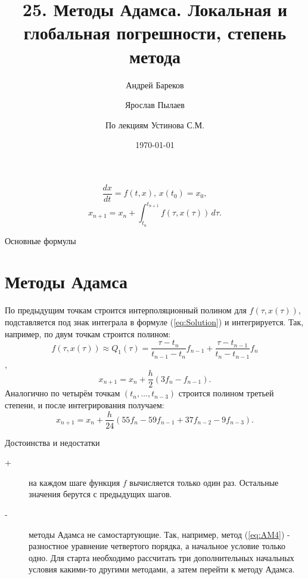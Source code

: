 \documentclass[a4paper,11pt]{article}
\title{25. Методы Адамса. Локальная и глобальная погрешности, степень метода}
\author{Андрей Бареков \and Ярослав Пылаев \and По лекциям Устинова С.М.}
\date{\today}
\begin{document}
\maketitle
\newpage

\begin{importantblock}
  \begin{equation}
    \frac{dx}{dt} = f(t, x),\, x(t_0) = x_0,
    \label{eq:LDLE}
  \end{equation}
  \begin{equation}
    x_{n+1} = x_n + \int_{t_n}^{t_{n+1}} f(\tau, x(\tau))\,d\tau.
    \label{eq:Solution}
  \end{equation}
  \begin{center}
    \small{Основные формулы}
  \end{center}
\end{importantblock}

\section{Методы Адамса}
По предыдущим точкам строится интерполяционный полином для $f(\tau, x(\tau))$, подставляется
  под знак интеграла в формуле (\ref{eq:Solution}) и интегрируется. Так, например, по двум точкам строится полином:
\[f(\tau,x(\tau)) \approx Q_1(\tau) = \frac{\tau - t_n}{t_{n-1} - t_n}f_{n-1} + \frac{\tau - t_{n-1}}{t_n - t_{n-1}}f_n\],
\begin{equation}
  x_{n+1} = x_n + \frac{h}{2}(3f_n - f_{n-1}).
  \label{eq:AM2}
\end{equation}
Аналогично по четырём точкам $(t_n, \dots, t_{n-3})$ строится полином третьей степени, и после интегрирования получаем:
\begin{equation}
  x_{n+1} = x_n + \frac{h}{24}(55f_n - 59f_{n-1} + 37f_{n-2} - 9f_{n-3}).
  \label{eq:AM4}
\end{equation}
\begin{importantblock}
  \begin{center}
    Достоинства и недостатки
  \end{center}
  \begin{description}
    \item [+] на каждом шаге функция $f$ вычисляется только один раз. Остальные значения берутся с предыдущих шагов.
    \item [-] методы Адамса не самостартующие. Так, например, метод (\ref{eq:AM4}) - разностное уравнение четвертого порядка, а начальное условие только одно.
              Для старта необходимо рассчитать три дополнительных начальных условия какими-то другими методами, а затем перейти к методу Адамса.
  \end{description}
\end{importantblock}
\end{document}
